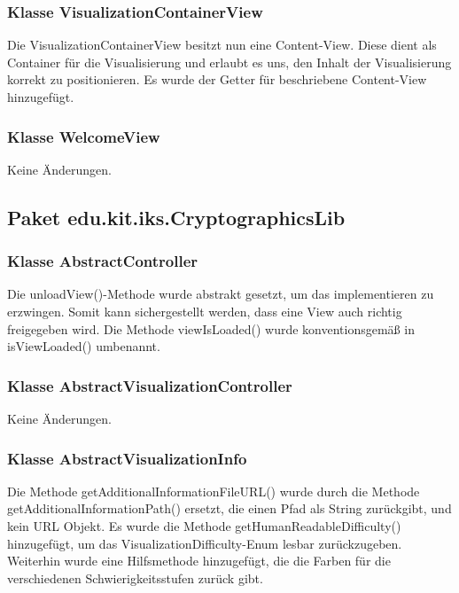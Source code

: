 \documentclass{article}
\begin{document}
    \subsubsection{Klasse VisualizationContainerView}
      Die VisualizationContainerView besitzt nun eine Content-View. Diese dient als Container für die Visualisierung
      und erlaubt es uns, den Inhalt der Visualisierung korrekt zu positionieren. Es wurde der Getter für
      beschriebene Content-View hinzugefügt.\newline

    \subsubsection{Klasse WelcomeView}
      Keine Änderungen.

  \subsection{Paket edu.kit.iks.CryptographicsLib}
    
  	\subsubsection{Klasse AbstractController}
  	
  	Die unloadView()-Methode wurde abstrakt gesetzt, um das implementieren zu erzwingen.
  	Somit kann sichergestellt werden, dass eine View auch richtig freigegeben wird. Die Methode
  	viewIsLoaded() wurde konventionsgemäß in isViewLoaded() umbenannt.

	\subsubsection{Klasse AbstractVisualizationController}
  Keine Änderungen.

	\subsubsection{Klasse AbstractVisualizationInfo}

	Die Methode getAdditionalInformationFileURL() wurde durch die Methode 
	getAdditionalInformationPath() ersetzt, die einen Pfad als String zurückgibt, und kein
	URL Objekt. Es wurde die Methode getHumanReadableDifficulty() hinzugefügt, um 
	das VisualizationDifficulty-Enum lesbar zurückzugeben. Weiterhin wurde eine Hilfsmethode
  hinzugefügt, die die Farben für die verschiedenen Schwierigkeitsstufen zurück gibt.
\end{document}
